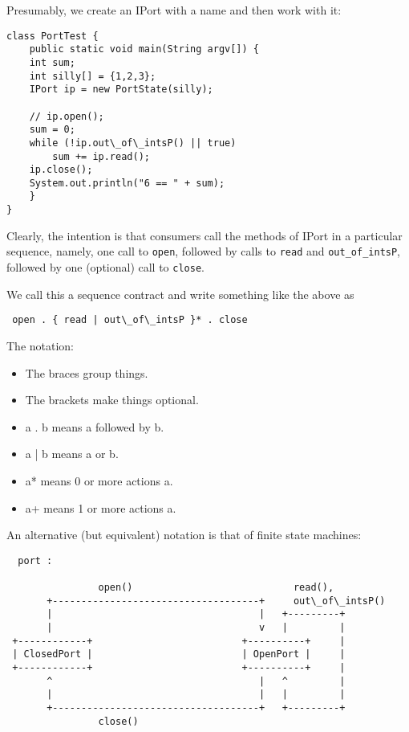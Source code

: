 \documentclass[11pt]{article}
\begin{document}
Presumably, we create an IPort with a name and then work with it: 

\begin{verbatim}
class PortTest {
    public static void main(String argv[]) {
	int sum; 
	int silly[] = {1,2,3}; 
	IPort ip = new PortState(silly);
     
	// ip.open();
	sum = 0; 
	while (!ip.out\_of\_intsP() || true)
	    sum += ip.read(); 
	ip.close(); 
	System.out.println("6 == " + sum); 
    }
}
\end{verbatim}

Clearly, the intention is that consumers call the methods of IPort in a
particular sequence, namely, one call to {\tt open}, followed by calls to
{\tt read} and {\tt out\_of\_intsP}, followed by one (optional) call
to {\tt  close}.

We call this a sequence contract and write something like the
above as

\begin{verbatim}
 open . { read | out\_of\_intsP }* . close
\end{verbatim}

The notation:
\begin{itemize}
\item The braces group things.
\item The brackets make things optional.
\item a . b means a followed by b.
\item a | b means a or b. 
\item a* means 0 or more actions a. 
\item a+ means 1 or more actions a. 
\end{itemize}


An alternative (but equivalent) notation is that of finite state machines:

\begin{verbatim}
  port :

                open()	                          read(), 
       +------------------------------------+     out\_of\_intsP()
       |                                    |   +---------+
       |                                    v   |         |
 +------------+                          +----------+     |
 | ClosedPort |                          | OpenPort |     |
 +------------+                          +----------+     |
       ^                                    |   ^         |
       |                                    |   |         |       
       +------------------------------------+   +---------+
                close()
\end{verbatim}
\end{document}
